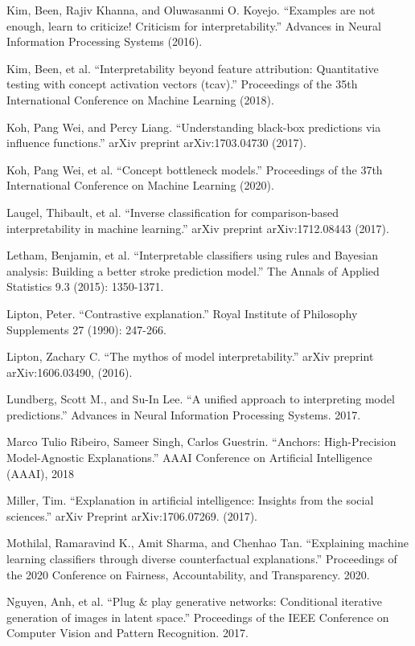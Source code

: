 \documentclass[12pt,]{krantz}
\begin{document}
Kim, Been, Rajiv Khanna, and Oluwasanmi O. Koyejo. ``Examples are not
enough, learn to criticize! Criticism for interpretability.'' Advances
in Neural Information Processing Systems (2016).

Kim, Been, et al. ``Interpretability beyond feature attribution:
Quantitative testing with concept activation vectors (tcav).''
Proceedings of the 35th International Conference on Machine Learning
(2018).

Koh, Pang Wei, and Percy Liang. ``Understanding black-box predictions
via influence functions.'' arXiv preprint arXiv:1703.04730 (2017).

Koh, Pang Wei, et al. ``Concept bottleneck models.'' Proceedings of the
37th International Conference on Machine Learning (2020).

Laugel, Thibault, et al. ``Inverse classification for comparison-based
interpretability in machine learning.'' arXiv preprint arXiv:1712.08443
(2017).

Letham, Benjamin, et al. ``Interpretable classifiers using rules and
Bayesian analysis: Building a better stroke prediction model.'' The
Annals of Applied Statistics 9.3 (2015): 1350-1371.

Lipton, Peter. ``Contrastive explanation.'' Royal Institute of
Philosophy Supplements 27 (1990): 247-266.

Lipton, Zachary C. ``The mythos of model interpretability.'' arXiv
preprint arXiv:1606.03490, (2016).

Lundberg, Scott M., and Su-In Lee. ``A unified approach to interpreting
model predictions.'' Advances in Neural Information Processing Systems.
2017.

Marco Tulio Ribeiro, Sameer Singh, Carlos Guestrin. ``Anchors:
High-Precision Model-Agnostic Explanations.'' AAAI Conference on
Artificial Intelligence (AAAI), 2018

Miller, Tim. ``Explanation in artificial intelligence: Insights from the
social sciences.'' arXiv Preprint arXiv:1706.07269. (2017).

Mothilal, Ramaravind K., Amit Sharma, and Chenhao Tan. ``Explaining
machine learning classifiers through diverse counterfactual
explanations.'' Proceedings of the 2020 Conference on Fairness,
Accountability, and Transparency. 2020.

Nguyen, Anh, et al. ``Plug \& play generative networks: Conditional
iterative generation of images in latent space.'' Proceedings of the
IEEE Conference on Computer Vision and Pattern Recognition. 2017.
\end{document}
